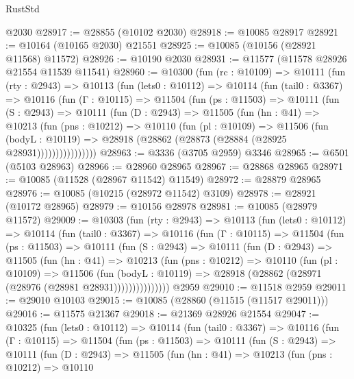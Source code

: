 \begin{lexlean}{RustStd}
\begin{coremodule}
    @2030
@28917 := @28855 (@10102 @2030)
@28918 := @10085 @28917
@28921 := @10164 (@10165 @2030) @21551
@28925 := @10085 (@10156 (@28921 @11568) @11572)
@28926 := @10190 @2030
@28931 := @11577 (@11578 @28926 @21554 @11539 @11541)
@28960 := @10300
    (fun (rc : @10109) =>
    @10111
      (fun (rty : @2943) =>
      @10113
        (fun (lets0 : @10112) =>
        @10114
          (fun (tail0 : @3367) =>
          @10116
            (fun (Γ : @10115) =>
            @11504
              (fun (ps : @11503) =>
              @10111
                (fun (S : @2943) =>
                @10111
                  (fun (D : @2943) =>
                  @11505
                    (fun (hn : @41) =>
                    @10213
                      (fun (pns : @10212) =>
                      @10110
                        (fun (pl : @10109) =>
                        @11506
                          (fun (bodyL : @10119) =>
                          @28918 (@28862 (@28873 (@28884 (@28925 @28931))))))))))))))))
@28963 := @3336 (@3705 @2959) @3346
@28965 := @6501 (@5103 @28963)
@28966 := @28960 @28965
@28967 := @28868 @28965
@28971 := @10085 (@11528 (@28967 @11542) @11549)
@28972 := @28879 @28965
@28976 := @10085 (@10215 (@28972 @11542) @3109)
@28978 := @28921 (@10172 @28965)
@28979 := @10156 @28978
@28981 := @10085 (@28979 @11572)
@29009 := @10303
    (fun (rty : @2943) =>
    @10113
      (fun (lets0 : @10112) =>
      @10114
        (fun (tail0 : @3367) =>
        @10116
          (fun (Γ : @10115) =>
          @11504
            (fun (ps : @11503) =>
            @10111
              (fun (S : @2943) =>
              @10111
                (fun (D : @2943) =>
                @11505
                  (fun (hn : @41) =>
                  @10213
                    (fun (pns : @10212) =>
                    @10110
                      (fun (pl : @10109) =>
                      @11506
                        (fun (bodyL : @10119) =>
                        @28918 (@28862 (@28971 (@28976 (@28981 @28931)))))))))))))))
    @2959
@29010 := @11518 @2959
@29011 := @29010 @10103
@29015 := @10085 (@28860 (@11515 (@11517 @29011)))
@29016 := @11575 @21367
@29018 := @21369 @28926 @21554
@29047 := @10325
    (fun (lets0 : @10112) =>
    @10114
      (fun (tail0 : @3367) =>
      @10116
        (fun (Γ : @10115) =>
        @11504
          (fun (ps : @11503) =>
          @10111
            (fun (S : @2943) =>
            @10111
              (fun (D : @2943) =>
              @11505
                (fun (hn : @41) =>
                @10213
                  (fun (pns : @10212) =>
                  @10110

\end{coremodule}
\end{lexlean}
